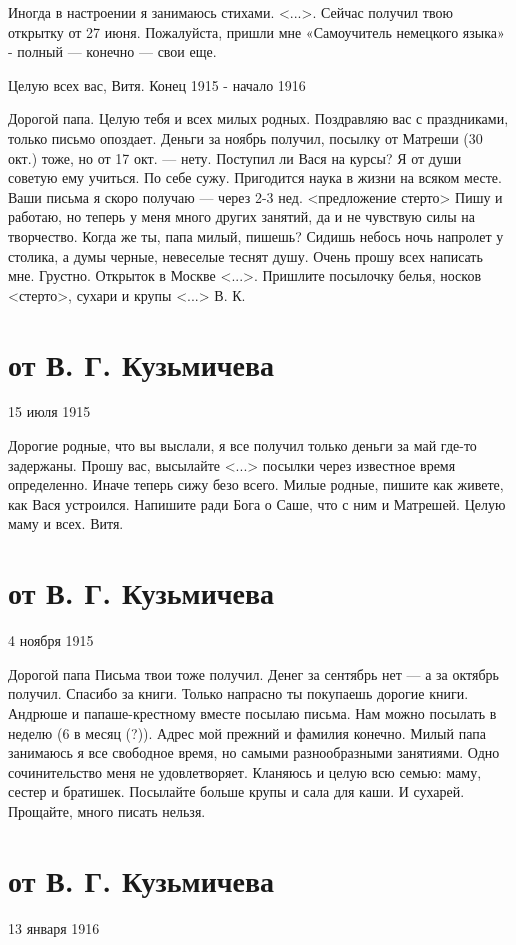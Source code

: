 \documentclass[]{memoir}
\begin{document}
Иногда в настроении я занимаюсь стихами. <...>. Сейчас получил твою открытку от 27 июня. Пожалуйста, пришли мне «Самоучитель немецкого языка» - полный — конечно — свои еще.

Целую всех вас, Витя.
Конец 1915 - начало 1916

Дорогой папа. Целую тебя и всех милых родных. Поздравляю вас с праздниками, только письмо опоздает. Деньги за ноябрь получил, посылку от Матреши (30 окт.) тоже, но от 17 окт. — нету. Поступил ли Вася на курсы? Я от души советую ему учиться. По себе сужу. Пригодится наука в жизни на всяком месте. Ваши письма я скоро получаю — через 2-3 нед. <предложение стерто>
Пишу и работаю, но теперь у меня много других занятий, да и не чувствую силы на творчество. Когда же ты, папа милый, пишешь? Сидишь небось ночь напролет у столика, а думы черные, невеселые теснят душу. Очень прошу всех написать мне. Грустно. Открыток в Москве <...>.
Пришлите посылочку белья, носков <стерто>, сухари и крупы <...> В. К.



\section{от В. Г. Кузьмичева}
15 июля 1915

Дорогие родные, что вы выслали, я все получил только деньги за май где-то задержаны. Прошу вас, высылайте <...> посылки через известное время определенно. Иначе теперь сижу безо всего. Милые родные, пишите как живете, как Вася устроился. Напишите ради Бога о Саше, что с ним и Матрешей. Целую маму и всех. Витя.

\section{от В. Г. Кузьмичева}
4 ноября 1915

Дорогой папа Письма твои тоже получил. Денег за сентябрь нет — а за октябрь получил. Спасибо за книги. Только напрасно ты покупаешь дорогие книги. Андрюше и папаше-крестному вместе посылаю письма. Нам можно посылать в неделю (6 в месяц (?)). Адрес мой прежний и фамилия конечно. Милый папа занимаюсь я все свободное время, но самыми разнообразными занятиями. Одно сочинительство меня не удовлетворяет. Кланяюсь и целую всю семью: маму, сестер и братишек. Посылайте больше крупы и сала для каши. И сухарей.
Прощайте, много писать нельзя.


\section{от В. Г. Кузьмичева}
13 января 1916
\end{document}
